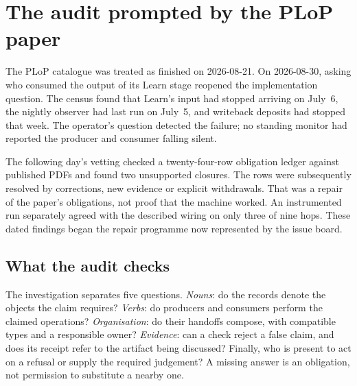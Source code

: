 \section{The audit prompted by the PLoP paper}\label{sec:case-vetting}



The PLoP catalogue was treated as finished on 2026-08-21. On 2026-08-30,
asking who consumed the output of its Learn stage reopened the implementation
question. The census found that Learn's input had stopped arriving on July~6,
the nightly observer had last run on July~5, and writeback deposits had stopped
that week. The operator's question detected the failure; no standing monitor
had reported the producer and consumer falling silent.

The following day's vetting checked a twenty-four-row obligation ledger against
published PDFs and found two unsupported closures. The rows were subsequently
resolved by corrections, new evidence or explicit withdrawals. That was a
repair of the paper's obligations, not proof that the machine worked. An
instrumented run separately agreed with the described wiring on only three of
nine hops. These dated findings began the repair programme now represented by
the issue board.

\subsection*{What the audit checks}

The investigation separates five questions. \emph{Nouns}: do the records denote
the objects the claim requires? \emph{Verbs}: do producers and consumers perform
the claimed operations? \emph{Organisation}: do their handoffs compose, with
compatible types and a responsible owner? \emph{Evidence}: can a check reject
a false claim, and does its receipt refer to the artifact being discussed?
Finally, who is present to act on a refusal or supply the required judgement?
A missing answer is an obligation, not permission to substitute a nearby one.

